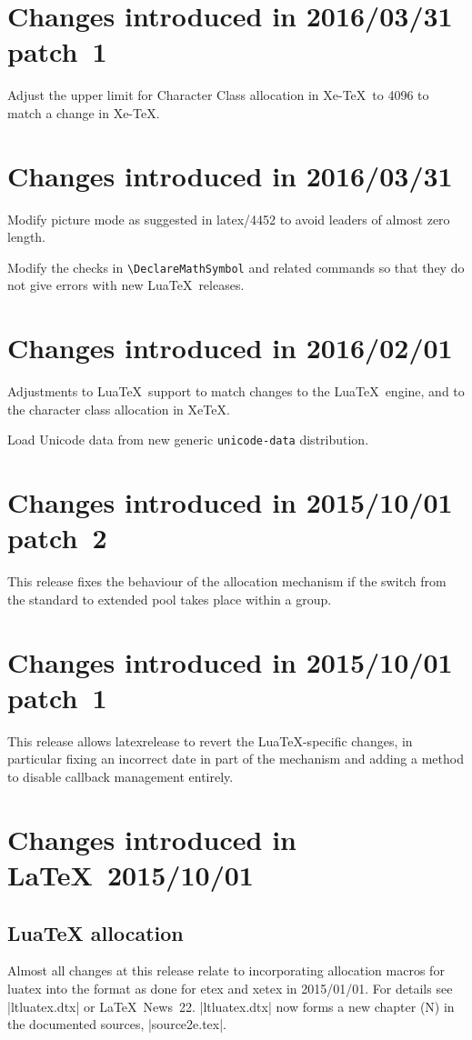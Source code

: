 \documentclass{ltxguide}
\newcommand\Lpack[1]{\mbox{\textsf{#1}}}
\newcommand\ltnewsissue[1]{\LaTeX\ News~#1}
\newcommand\ltnewsissue[1]{%
    \href{https://www.latex-project.org/news/latex2e-news/ltnews#1.pdf}{\LaTeX\ News~#1}}
\begin{document}
\section{Changes  introduced in 2016/03/31 patch~1}
Adjust the upper limit for Character Class allocation in Xe-\TeX\ to
4096 to match a change in Xe-\TeX.

\section{Changes  introduced in 2016/03/31}
Modify picture mode as suggested in latex/4452 to avoid leaders of
almost zero length.

Modify the checks in \verb|\DeclareMathSymbol| and related commands
so that they do not give errors with new Lua\TeX\ releases.

\section{Changes  introduced in 2016/02/01}
Adjustments to Lua\TeX\ support to match changes to the Lua\TeX\ engine,
and to the character class allocation in Xe\TeX.

Load Unicode data from new generic \texttt{unicode-data} distribution.

\section{Changes  introduced in 2015/10/01 patch~2}

This release fixes the behaviour of the allocation mechanism if the switch
from the standard to extended pool takes place within a group.

\section{Changes  introduced in 2015/10/01 patch~1}
This release allows \Lpack{latexrelease} to revert the 
Lua\TeX{}-specific
changes, in particular fixing an incorrect date in part of the mechanism and
adding a method to disable callback management entirely.

\section{Changes  introduced in \LaTeX\ 2015/10/01}

\subsection{LuaTeX allocation}
Almost all changes at this release relate to incorporating allocation macros for luatex into the format
as done for etex and xetex in 2015/01/01. For details see |ltluatex.dtx| or \ltnewsissue{22}.
|ltluatex.dtx| now forms a new chapter (N) in the documented sources, |source2e.tex|.
\end{document}
